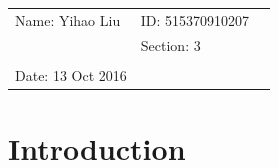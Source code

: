 \documentclass{article}
\begin{document}
\vspace*{0.25cm}

\hrulefill

\thispagestyle{empty}

\begin{center}
\begin{large}
\end{large}

\hrulefill

\vspace*{5cm}
\begin{Large}
\end{Large}

\vspace{2em}

\begin{large}
\end{large}
\end{center}


\vfill

\begin{table}[h!]
\flushleft
\begin{tabular}{lll}
Name: Yihao Liu \hspace*{2em}&
ID: 515370910207\hspace*{2em}\\
& Section: 3\\


\\

Date: 13 Oct 2016 

\end{tabular}
\end{table}

\hfill
\begin{tiny}
[rev. 1.0]
\end{tiny}
\newpage

\section{Introduction}
\end{document}
